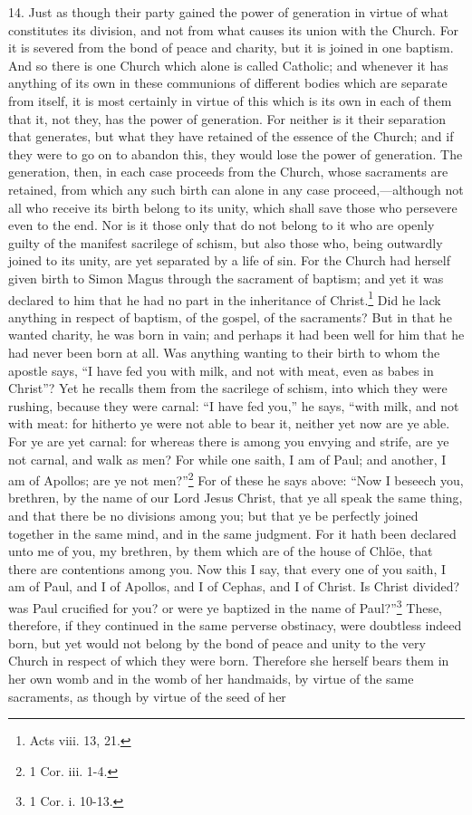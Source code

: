 14. Just as though their party gained the power of generation in virtue of what constitutes its division, and not from what causes its union with the Church. For it is severed from the bond of peace and charity, but it is joined in one baptism. And so there is one Church which alone is called Catholic; and whenever it has anything of its own in these communions of different bodies which are separate from itself, it is most certainly in virtue of this which is its own in each of them that it, not they, has the power of generation. For neither is it their separation that generates, but what they have retained of the essence of the Church; and if they were to go on to abandon this, they would lose the power of generation. The generation, then, in each case proceeds from the Church, whose sacraments are retained, from which any such birth can alone in any case proceed,—although not all who receive its birth belong to its unity, which shall save those who persevere even to the end. Nor is it those only that do not belong to it who are openly guilty of the manifest sacrilege of schism, but also those who, being outwardly joined to its unity, are yet separated by a life of sin. For the Church had herself given birth to Simon Magus through the sacrament of baptism; and yet it was declared to him that he had no part in the inheritance of Christ.\footnote{\par  Acts viii. 13, 21.} Did he lack anything in respect of baptism, of the gospel, of the sacraments? But in that he wanted charity, he was born in vain; and perhaps it had been well for him that he had never been born at all. Was anything wanting to their birth to whom the apostle says, ``I have fed you with milk, and not with meat, even as babes in Christ''? Yet he recalls them from the sacrilege of schism, into which they were rushing, because they were carnal: ``I have fed you,'' he says, ``with milk, and not with meat: for hitherto ye were not able to bear it, neither yet now are ye able. For ye are yet carnal: for whereas there is among you envying and strife, are ye not carnal, and walk as men? For while one saith, I am of Paul; and another, I am of Apollos; are ye not men?''\footnote{\par  1 Cor. iii. 1-4.} For of these he says above: ``Now I beseech you, brethren, by the name of our Lord Jesus Christ, that ye all speak the same thing, and that there be no divisions among you; but that ye be perfectly joined together in the same mind, and in the same judgment. For it hath been declared unto me of you, my brethren, by them which are of the house of Chlöe, that there are contentions among you. Now this I say, that every one of you saith, I am of Paul, and I of Apollos, and I of Cephas, and I of Christ. Is Christ divided? was Paul crucified for you? or were ye baptized in the name of Paul?''\footnote{\par  1 Cor. i. 10-13.} These, therefore, if they continued in the same perverse obstinacy, were doubtless indeed born, but yet would not belong by the bond of peace and unity to the very Church in respect of which they were born. Therefore she herself bears them in her own womb and in the womb of her handmaids, by virtue of the same sacraments, as though by virtue of the seed of her 